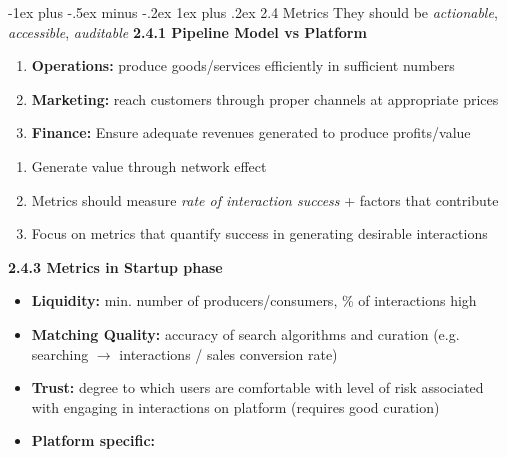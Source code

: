 \documentclass[10pt,landscape]{article}
\makeatletter
\newcommand{\subsubsubsection}{\@startsection{subsubsection}{3}{0mm}%
                                {-1ex plus -.5ex minus -.2ex}%
                                {1ex plus .2ex}%
                                {\normalfont\scriptsize\bfseries}}
\makeatother
\begin{document}
\begin{multicols*}{3}
\subsubsubsection{2.4 Metrics}
They should be \textit{actionable}, \textit{accessible}, \textit{auditable}
\textbf{2.4.1 Pipeline Model vs Platform}
\begin{enumerate}[label=\alph*.,topsep=0pt,noitemsep,wide=0pt, leftmargin=\dimexpr\labelwidth + 2\labelsep\relax]
    \item \textbf{Operations:} produce goods/services efficiently in sufficient numbers
    \item \textbf{Marketing:} reach customers through proper channels at appropriate prices
    \item \textbf{Finance:} Ensure adequate revenues generated to produce profits/value
\end{enumerate}
\begin{enumerate}[topsep=0pt,noitemsep,wide=0pt, leftmargin=\dimexpr\labelwidth + 2\labelsep\relax]
    \item Generate value through network effect
    \item Metrics should measure \textit{rate of interaction success} + factors that contribute
    \item Focus on metrics that quantify success in generating desirable interactions
\end{enumerate}

\textbf{2.4.3 Metrics in Startup phase}
\begin{itemize}[topsep=0pt,noitemsep,wide=0pt, leftmargin=\dimexpr{} + 2\relax]
    \item \textbf{Liquidity:} min. number of producers/consumers, \% of interactions high
    \item \textbf{Matching Quality:} accuracy of search algorithms and curation (e.g. searching $\rightarrow$ interactions / sales conversion rate)
    \item \textbf{Trust:} degree to which users are comfortable with level of risk associated with engaging in interactions on platform (requires good curation)
    \item \textbf{Platform specific:}
    \begin{itemize}[topsep=0pt,noitemsep,wide=0pt, leftmargin=\dimexpr{} + 2\relax]
    \end{itemize}
\end{itemize}


\end{multicols*}
\end{document}
